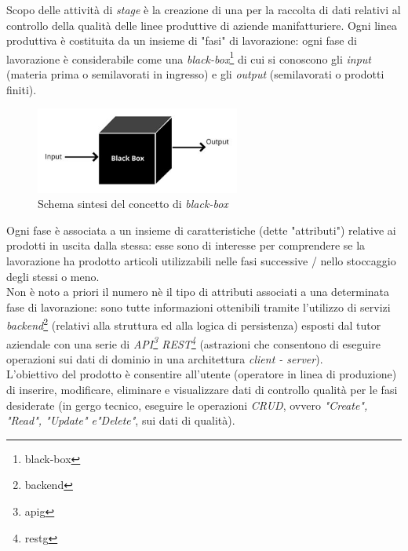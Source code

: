 Scopo delle attività di \textit{stage} è la creazione di una  per la raccolta di dati relativi al controllo della qualità delle linee produttive di aziende manifatturiere.
Ogni linea produttiva è costituita da un insieme di "fasi" di lavorazione: ogni fase di lavorazione è considerabile come una \textit{black-box}\footnote{\gls{black-box}} di cui si conoscono gli \textit{input} (materia prima o semilavorati in ingresso)
e gli \textit{output} (semilavorati o prodotti finiti).
\begin{figure}[H]
    \centering
    \includegraphics[width=0.6\textwidth]{images/black-box.png}
    \caption[Schema sintesi del concetto di \textit{black-box}]{Schema sintesi del concetto di \textit{black-box}\footnotemark}
\end{figure}
Ogni fase è associata a un insieme di caratteristiche (dette "attributi") relative ai prodotti in uscita dalla stessa: esse sono di interesse per comprendere se la lavorazione ha prodotto articoli utilizzabili nelle fasi successive / nello stoccaggio degli stessi o meno. \\
Non è noto a priori il numero nè il tipo di attributi associati a una determinata fase di lavorazione: sono tutte informazioni ottenibili tramite l'utilizzo di servizi \textit{backend}\footnote{\gls{backend}} (relativi alla struttura ed alla logica di persistenza) esposti dal tutor aziendale con una
serie di \textit{API\footnote{\gls{apig}} REST\footnote{\gls{restg}}} (astrazioni che consentono di eseguire operazioni sui dati di dominio in una architettura \textit{client - server}). \\
L'obiettivo del prodotto è consentire all'utente (operatore in linea di produzione) di inserire, modificare, eliminare e visualizzare dati di controllo qualità per le fasi desiderate (in gergo tecnico, eseguire le operazioni \textit{CRUD}, ovvero \textit{"Create", "Read", "Update" e"Delete"}, sui dati di qualità).

